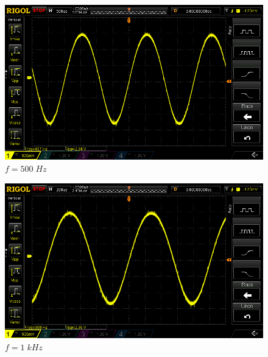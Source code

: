 \documentclass[uplatex,a4paper,11pt,oneside,openany]{jsbook}
\begin{document}
\begin{spacing}{0.67}
  \begin{multicols}{2}
    \begin{figure}[H]
       \centering
        \includegraphics[keepaspectratio, scale=0.28, angle=0]
                    {rigol/figs/FrqCharM1Y1_2kR/500hz.png}
                    \caption{$f=500\;Hz$}
                    \label{fig:frq500}
    \end{figure}
  
    \begin{figure}[H]
       \centering
        \includegraphics[keepaspectratio, scale=0.28, angle=0]
                  {rigol/figs/FrqCharM1Y1_2kR/1khz.png}
                  \caption{$f=1\;kHz$}
                  \label{fig:frq1k}
    \end{figure}
  \end{multicols}


\end{spacing}
\end{document}
